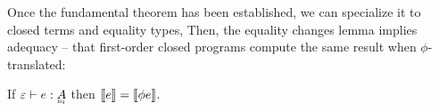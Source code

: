 Once the fundamental theorem has been established, we can specialize it to
closed terms and equality types, Then, the equality changes lemma implies
adequacy -- that first-order closed programs compute the same result when
$\phi$-translated:

\begin{theorem}[adequacy]
  If\/ $\J e {\emptycx} {\eqt A}$ then\/ $\llbracket{e}\rrbracket = \llbracket{\phi e}\rrbracket$.
\end{theorem}






